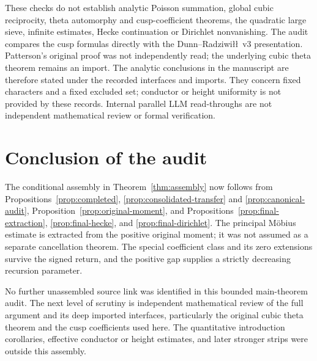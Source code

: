 \documentclass[11pt]{article}
\numberwithin{equation}{section}
\theoremstyle{definition}
\theoremstyle{remark}
\begin{document}
These checks do not establish analytic Poisson summation, global cubic
reciprocity, theta automorphy and cusp-coefficient theorems, the quadratic
large sieve, infinite estimates, Hecke continuation or Dirichlet
nonvanishing. The audit compares the cusp formulas directly with the
Dunn--Radziwi\l\l\ v3 presentation. Patterson's original proof was
not independently read; the underlying cubic theta theorem remains an
import. The analytic conclusions in the manuscript are therefore stated
under the recorded interfaces and imports. They concern fixed characters
and a fixed excluded set; conductor or height uniformity is not
provided by these records. Internal parallel LLM read-throughs are not
independent mathematical review or formal verification.



\section{Conclusion of the audit}

The conditional assembly in Theorem~\ref{thm:assembly} now follows
from Propositions~\ref{prop:completed}, \ref{prop:consolidated-transfer}
and \ref{prop:canonical-audit}, Proposition~\ref{prop:original-moment},
and Propositions~\ref{prop:final-extraction},
\ref{prop:final-hecke}, and \ref{prop:final-dirichlet}.
The principal M\"obius estimate is extracted from the positive
original moment; it was not assumed as a separate cancellation
theorem. The special coefficient class and its zero extensions
survive the signed return, and the positive gap supplies
a strictly decreasing recursion parameter.

No further unassembled source link was identified in this
bounded main-theorem audit. The next level of scrutiny is
independent mathematical review of the full argument and its
deep imported interfaces, particularly the original cubic theta
theorem and the cusp coefficients used here. The quantitative
introduction corollaries, effective conductor or height estimates,
and later stronger strips were outside this assembly.
\end{document}
